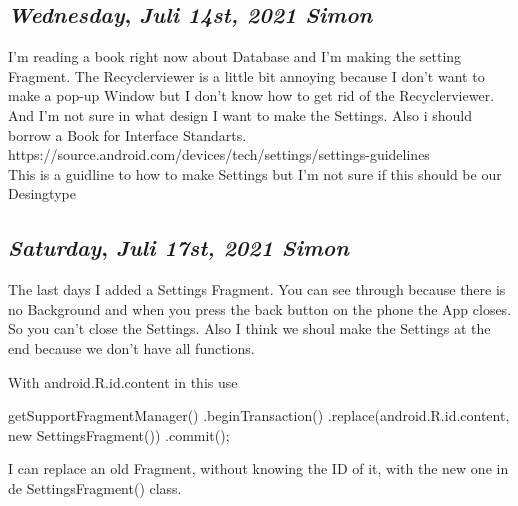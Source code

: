 \begin{center}
\section*{\month}
\end{center}


\def\day{\textit{Juli 14st, 2021 Simon}}
\def\weekday{\textit{Wednesday}}
\subsection*{\weekday, \day}

I'm reading a book right now about Database and I'm making the setting Fragment. The Recyclerviewer is a little bit annoying 
because I don't want to make a pop-up Window but I don't know how to get rid of the Recyclerviewer. And I'm not sure in what design 
I want to make the Settings. Also i should borrow a Book for Interface Standarts.
\\
https://source.android.com/devices/tech/settings/settings-guidelines
\\
This is a guidline to how to make Settings but I'm not sure if this should be our Desingtype


\def\day{\textit{Juli 17st, 2021 Simon}}
\def\weekday{\textit{Saturday}}
\subsection*{\weekday, \day}

The last days I added a Settings Fragment. You can see through because there is no Background and when you press the back button on the phone
the App closes. So you can't close the Settings. Also I think we shoul make the Settings at the end because we don't have 
all functions. 

With android.R.id.content in this use

getSupportFragmentManager()
                        .beginTransaction()
                        .replace(android.R.id.content, new SettingsFragment())
                        .commit();

I can replace an old Fragment, without knowing the ID of it, with the new one in de SettingsFragment() class.
